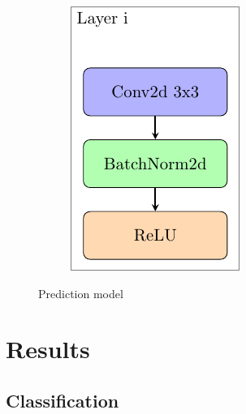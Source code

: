 \documentclass[review]{elsarticle}
\theoremstyle{definition} %
\theoremstyle{remark}
\begin{document}
\begin{figure}[ht!]
{\begin{subfigure}[b]{.30\textwidth}
		\includegraphics[width=\textwidth]{./figures/modellayer.pdf}\\
		\vspace{2cm}
	\end{subfigure}
    }
	\hfill 
	\caption{Prediction model}  
	\label{fig:drmodel} 
\end{figure}

\section{Results}\label{sec:results}

\subsection{Classification}
\end{document}
